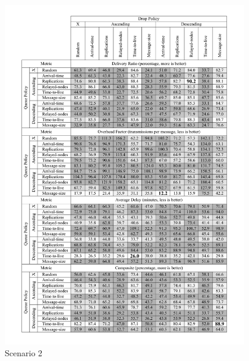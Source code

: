 \documentclass[conference,10pt,letterpaper,final]{IEEEtran}
\begin{document}
\begin{figure}[h]
	\centering
	\includegraphics[width=0.95\textwidth]{graphics/tables/scenario2}
	\caption{Scenario 2}
	\label{results:scenario2}
\end{figure}
\end{document}
